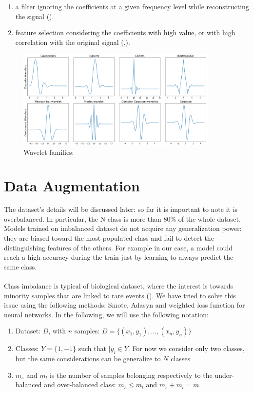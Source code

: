 \documentclass[LaM,binding=0.6cm]{sapthesis}
\begin{document}
\begin{enumerate}
\item a filter ignoring the coefficients at a given frequency level while reconstructing the signal (\cite{lnlf}).
\item feature selection considering the coefficients with high value, or with high correlation with the original signal (\cite{rfdwt},\cite{lnlf}).
\end{enumerate}
\begin{figure}  \centering
    \includegraphics[width=100mm,scale=0.7]{waveletfamilies.png}
    \caption{Wavelet families: \cite{watut} }
    \label{fig:wf}
\end{figure}





\section{Data Augmentation}
The dataset's details will be discussed later: so far it is important to note it is overbalanced. In particular, the N class is more than 80\% of the whole dataset. Models trained on imbalanced dataset do not acquire any generalization power: they are biased toward the most populated class and fail to detect the distinguishing features of the others. For example in our case, a model could reach a high accuracy during the train just by learning to always predict the same class.\\\\Class imbalance is typical of biological dataset, where the interest is towards minority samples that are linked to rare events (\cite{conf/ijcnn/HeBGL08}). We have tried to solve this issue using the following methods: Smote, Adasyn and weighted loss function for neural networks. In the following, we will use the following notation:
\begin{enumerate}
\item Dataset: $D$, with $n$ samples: $D=\{(x_1,y_1),\dots,(x_n,y_n)\}$
\item Classes: $Y=\{1,-1\}$ such that $|y_i \in Y$. For now we consider only two classes, but the same considerations can be generalize to $N$ classes 
\item $m_s$ and $m_l$ is the number of samples belonging respectively to the under-balanced and over-balanced class: $m_s\leq m_l$ and $m_s+m_l=m$
\end{enumerate}
\end{document}
